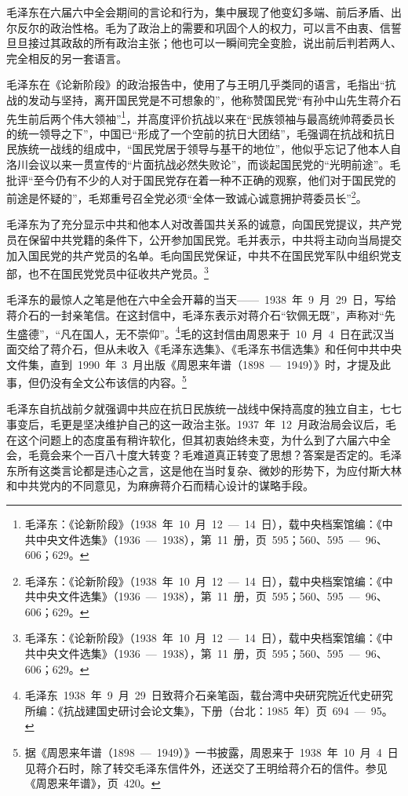 毛泽东在六届六中全会期间的言论和行为，集中展现了他变幻多端、前后矛盾、出尔反尔的政治性格。毛为了政治上的需要和巩固个人的权力，可以言不由衷、信誓旦旦接过其政敌的所有政治主张；他也可以一瞬间完全变脸，说出前后判若两人、完全相反的另一套语言。

毛泽东在《论新阶段》的政治报告中，使用了与王明几乎类同的语言，毛指出“抗战的发动与坚持，离开国民党是不可想象的”，他称赞国民党“有孙中山先生蒋介石先生前后两个伟大领袖”\footnote{毛泽东：《论新阶段》（1938~年~10~月~12~—~14~日），载中央档案馆编：《中共中央文件选集》（1936~—~1938），第~11~册，页~595；560、595~—~96、606；629。}，并高度评价抗战以来在“民族领袖与最高统帅蒋委员长的统一领导之下”，中国已“形成了一个空前的抗日大团结”，毛强调在抗战和抗日民族统一战线的组成中，“国民党居于领导与基干的地位”，他似乎忘记了他本人自洛川会议以来一贯宣传的“片面抗战必然失败论”，而谈起国民党的“光明前途”。毛批评“至今仍有不少的人对于国民党存在着一种不正确的观察，他们对于国民党的前途是怀疑的”，毛郑重号召全党必须“全体一致诚心诚意拥护蒋委员长”\footnote{毛泽东：《论新阶段》（1938~年~10~月~12~—~14~日），载中央档案馆编：《中共中央文件选集》（1936~—~1938），第~11~册，页~595；560、595~—~96、606；629。}。

毛泽东为了充分显示中共和他本人对改善国共关系的诚意，向国民党提议，共产党员在保留中共党籍的条件下，公开参加国民党。毛并表示，中共将主动向当局提交加入国民党的共产党员的名单。毛向国民党保证，中共不在国民党军队中组织党支部，也不在国民党党员中征收共产党员。\footnote{毛泽东：《论新阶段》（1938~年~10~月~12~—~14~日），载中央档案馆编：《中共中央文件选集》（1936~—~1938），第~11~册，页~595；560、595~—~96、606；629。}

毛泽东的最惊人之笔是他在六中全会开幕的当天——~1938~年~9~月~29~日，写给蒋介石的一封亲笔信。在这封信中，毛泽东表示对蒋介石“钦佩无既”，声称对“先生盛德”，“凡在国人，无不崇仰”。\footnote{毛泽东~1938~年~9~月~29~日致蒋介石亲笔函，载台湾中央研究院近代史研究所编：《抗战建国史研讨会论文集》，下册（台北：1985~年）页~694~—~95。}毛的这封信由周恩来于~10~月~4~日在武汉当面交给了蒋介石，但从未收入《毛泽东选集》、《毛泽东书信选集》和任何中共中央文件集，直到~1990~年~3~月出版《周恩来年谱（1898~—~1949）》时，才提及此事，但仍没有全文公布该信的内容。\footnote{据《周恩来年谱（1898~—~1949）》一书披露，周恩来于~1938~年~10~月~4~日见蒋介石时，除了转交毛泽东信件外，还送交了王明给蒋介石的信件。参见《周恩来年谱》，页~420。}

毛泽东自抗战前夕就强调中共应在抗日民族统一战线中保持高度的独立自主，七七事变后，毛更是坚决维护自己的这一政治主张。1937~年~12~月政治局会议后，毛在这个问题上的态度虽有稍许软化，但其初衷始终未变，为什么到了六届六中全会，毛竟会来个一百八十度大转变？毛难道真正转变了思想？答案是否定的。毛泽东所有这类言论都是违心之言，这是他在当时复杂、微妙的形势下，为应付斯大林和中共党内的不同意见，为麻痹蒋介石而精心设计的谋略手段。

